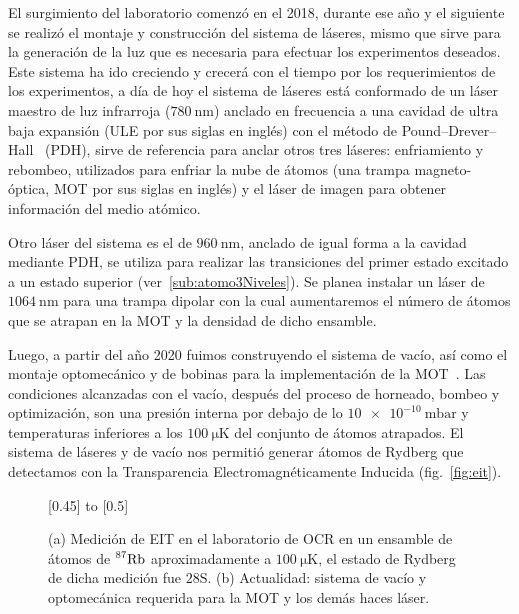 El surgimiento del laboratorio comenzó en el 2018, durante ese año y el siguiente se realizó el montaje y construcción del sistema de láseres, mismo que sirve para la generación de la luz que es necesaria para efectuar los experimentos deseados. Este sistema ha ido creciendo y crecerá con el tiempo por los requerimientos de los experimentos, a día de hoy el sistema de láseres está conformado de un láser maestro de luz infrarroja ($\SI{780}{\nano\meter}$) anclado en frecuencia a una cavidad de ultra baja expansión (ULE por sus siglas en inglés) con el método de Pound–Drever–Hall~\cite{black} (PDH), sirve de referencia para anclar otros tres láseres: enfriamiento y rebombeo, utilizados para enfriar la nube de átomos (una trampa magneto-óptica, MOT por sus siglas en inglés) y el láser de imagen para obtener información del medio atómico.

\p Otro láser del sistema es el de $\SI{960}{\nano\meter}$, anclado de igual forma a la cavidad mediante PDH, se utiliza para realizar las transiciones del primer estado excitado a un estado superior (ver~\ref{sub:atomo3Niveles}). Se planea instalar un láser de $\SI{1064}{\nano\meter}$ para una trampa dipolar con la cual aumentaremos el número de átomos que se atrapan en la MOT y la densidad de dicho ensamble.

\p Luego, a partir del año 2020 fuimos construyendo el sistema de vacío, así como el montaje optomecánico y de bobinas para la implementación de la MOT~\cite{alonso}. Las condiciones alcanzadas con el vacío, después del proceso de horneado, bombeo y optimización, son una presión interna por debajo de lo $\SI{10e-10}{\milli\bar}$ y temperaturas inferiores a los $\SI{100}{\micro\kelvin}$ del conjunto de átomos atrapados. El sistema de láseres y de vacío nos permitió generar átomos de Rydberg que detectamos con la Transparencia Electromagnéticamente Inducida (fig.~\ref{fig:eit}).

\newsavebox{\avancesBox}
\begin{figure}[!ht]
\centering
\begin{minipage}{0.9\textwidth}
\centering
{}
\subcaptionbox{\label{fig:vacioActual}}[0.45\linewidth]{
\vbox to \ht{}}
\hfill
\subcaptionbox{\label{fig:eit}}[0.5\linewidth]{\usebox{\avancesBox}}
\caption[Trabajo en laboratorio de OCR]{\label{fig:eitVacioActual}(a) Medición de EIT en el laboratorio de OCR en un ensamble de átomos de $\prescript{87}{}{\mathrm{Rb}}$ aproximadamente a $\SI{100}{\micro\kelvin}$, el estado de Rydberg de dicha medición fue $28\mathrm{S}$. (b) Actualidad: sistema de vacío y optomecánica requerida para la MOT y los demás haces láser.}
\end{minipage}
\end{figure}